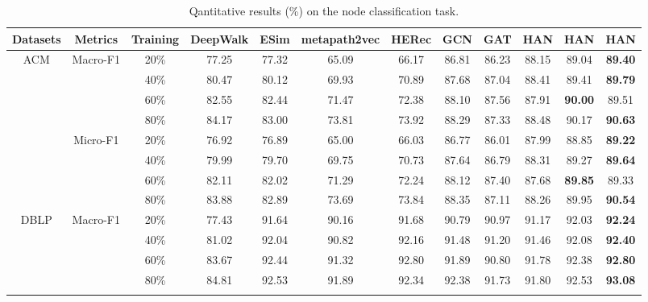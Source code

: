 \begin{table*}[]
	\centering
	\caption{Qantitative results (\%) on the node classification task.}\label{table_fenlei}
\begin{tabular}
{|c|c|c||c|c|c|c|c|c||c|c|c|}


		\hline
		Datasets                  & Metrics                   & Training & {DeepWalk}    & ESim  & {metapath2vec} & HERec & GCN   & {GAT}   & HAN & {HAN}    & HAN           \\ \hline
		\multirow{8}{*}{ACM}  & \multirow{4}{*}{Macro-F1} & 20\%  & 77.25 & 77.32 & 65.09  & 66.17 & 86.81 & 86.23 & 88.15       & 89.04          & \textbf{89.40} \\
		&                           & 40\%  & 80.47 & 80.12 & 69.93  & 70.89 & 87.68 & 87.04 & 88.41       & 89.41          & \textbf{89.79} \\
		&                           & 60\%  & 82.55 & 82.44 & 71.47  & 72.38 & 88.10 & 87.56 & 87.91       & \textbf{90.00} & 89.51          \\
		&                           & 80\%  & 84.17 & 83.00 & 73.81  & 73.92 & 88.29 & 87.33 & 88.48       & 90.17          & \textbf{90.63} \\ \cline{2-12} 
		& \multirow{4}{*}{Micro-F1} & 20\%  & 76.92 & 76.89 & 65.00  & 66.03 & 86.77 & 86.01 & 87.99       & 88.85          & \textbf{89.22} \\
		&                           & 40\%  & 79.99 & 79.70 & 69.75  & 70.73 & 87.64 & 86.79 & 88.31       & 89.27          & \textbf{89.64} \\
		&                           & 60\%  & 82.11 & 82.02 & 71.29  & 72.24 & 88.12 & 87.40 & 87.68       & \textbf{89.85} & 89.33          \\
		&                           & 80\%  & 83.88 & 82.89 & 73.69  & 73.84 & 88.35 & 87.11 & 88.26       & 89.95          & \textbf{90.54} \\ \hline
		\multirow{8}{*}{DBLP} & \multirow{4}{*}{Macro-F1} & 20\%  & 77.43 & 91.64 & 90.16  & 91.68 & 90.79 & 90.97 & 91.17       & 92.03          & \textbf{92.24} \\
		&                           & 40\%  & 81.02 & 92.04 & 90.82  & 92.16 & 91.48 & 91.20 & 91.46       & 92.08          & \textbf{92.40} \\
		&                           & 60\%  & 83.67 & 92.44 & 91.32  & 92.80 & 91.89 & 90.80 & 91.78       & 92.38          & \textbf{92.80} \\
		&                           & 80\%  & 84.81 & 92.53 & 91.89  & 92.34 & 92.38 & 91.73 & 91.80       & 92.53          & \textbf{93.08} \\ \cline{2-12} 

\end{tabular}
\end{table*}
